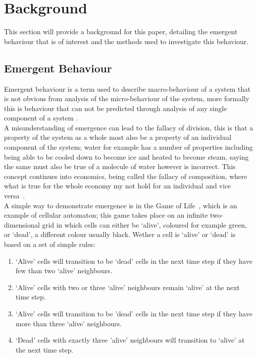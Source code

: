 \documentclass{article}
\begin{document}


\section{Background}
This section will provide a background for this paper, detailing the emergent behaviour that is of interest and the methods used to investigate this behaviour.  

\subsection{Emergent Behaviour}
Emergent behaviour is a term used to describe macro-behaviour of a system that is not obvious from analysis of the micro-behaviour of the system, more formally this is behaviour that can not be predicted through analysis of any single component of a system \cite{EB_systemofsystemsGLangford}.\\
A misunderstanding of emergence can lead to the fallacy of division, this is that a property of the system as a whole most also be a property of an individual component of the system; water for example has a number of properties including being able to be cooled down to become ice and heated to become steam, saying the same must also be true of a molecule of water however is incorrect. This concept continues into economics, being called the fallacy of composition, where what is true for the whole economy my not hold for an individual and vice versa~\cite{fallacyofcompostionBook}.\\       
A simple way to demonstrate emergence is in the Game of Life~\cite{gameoflifepage}, which is an example of cellular automaton; this game takes place on an infinite two-dimensional grid in which cells can either be `alive', coloured for example green, or `dead', a different colour usually black. Wether a cell is `alive' or `dead' is based on a set of simple rules:   
\begin{enumerate}
  \item `Alive' cells will transition to be `dead' cells in the next time step if they have few than two `alive' neighbours.
  \item `Alive' cells with two or three `alive' neighbours remain `alive' at the next time step.
  \item `Alive' cells will transition to be 'dead' cells in the next time step if they have more than three `alive' neighbours.
  \item `Dead' cells with exactly three 'alive' neighbours will transition to `alive' at the next time step.
\end{enumerate}
\end{document}

